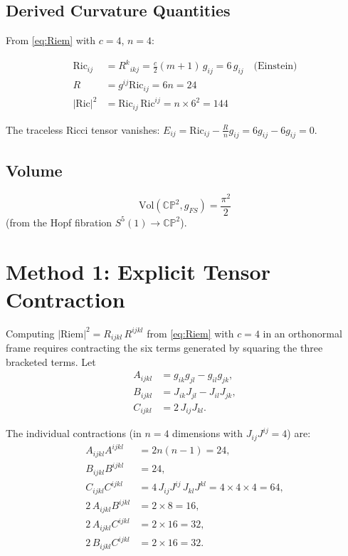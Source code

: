 \documentclass[11pt]{article}
\newcommand{\Riem}{\mathrm{Riem}}
\newcommand{\Ric}{\mathrm{Ric}}
\newcommand{\vol}{\mathrm{Vol}}
\begin{document}
\subsection{Derived Curvature Quantities}

From \eqref{eq:Riem} with $c = 4$, $n = 4$:

\begin{align}
  \Ric_{ij} &= R^k{}_{ikj} = \frac{c}{2}(m+1)\,g_{ij} = 6\,g_{ij}
  \quad\text{(Einstein)} \\[4pt]
  R &= g^{ij}\Ric_{ij} = 6n = 24 \\[4pt]
  |\Ric|^2 &= \Ric_{ij}\,\Ric^{ij} = n \times 6^2 = 144
\end{align}

The traceless Ricci tensor vanishes: $E_{ij} = \Ric_{ij} - \frac{R}{n}g_{ij}
= 6g_{ij} - 6g_{ij} = 0$.

\subsection{Volume}

\begin{equation}
  \vol(\mathbb{CP}^2, g_{FS}) = \frac{\pi^2}{2}
\end{equation}
(from the Hopf fibration $S^5(1) \to \mathbb{CP}^2$).

\section{Method 1: Explicit Tensor Contraction}

Computing $|\Riem|^2 = R_{ijkl}\,R^{ijkl}$ from \eqref{eq:Riem} with $c = 4$
in an orthonormal frame requires contracting the six terms generated by squaring the
three bracketed terms. Let
\begin{align}
  A_{ijkl} &= g_{ik}g_{jl} - g_{il}g_{jk}, \\
  B_{ijkl} &= J_{ik}J_{jl} - J_{il}J_{jk}, \\
  C_{ijkl} &= 2\,J_{ij}J_{kl}.
\end{align}

The individual contractions (in $n=4$ dimensions with $J_{ij}J^{ij} = 4$) are:
\begin{align}
  A_{ijkl}A^{ijkl} &= 2n(n-1) = 24, \\
  B_{ijkl}B^{ijkl} &= 24, \\
  C_{ijkl}C^{ijkl} &= 4\,J_{ij}J^{ij}\,J_{kl}J^{kl} = 4 \times 4 \times 4 = 64, \\
  2\,A_{ijkl}B^{ijkl} &= 2 \times 8 = 16, \\
  2\,A_{ijkl}C^{ijkl} &= 2 \times 16 = 32, \\
  2\,B_{ijkl}C^{ijkl} &= 2 \times 16 = 32.
\end{align}
\end{document}
